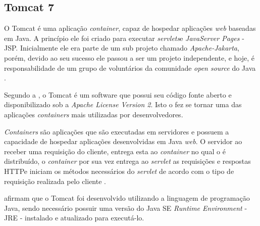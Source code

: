 \subsection{Tomcat 7}

\par O Tomcat é uma aplicação \textit{container}, capaz de hospedar aplicações \textit{web} baseadas em Java. A princípio ele foi criado para executar \textit{servlets}\footnotemark[14] e \textit{JavaServer Pages} - JSP\footnotemark[15]. Inicialmente ele era parte de um sub projeto chamado \textit{Apache-Jakarta}, porém, devido ao seu sucesso ele passou a ser um projeto independente, e hoje, é responsabilidade de um grupo de voluntários da comunidade \textit{open source} do Java \cite{vukotic_goodwill_apache_tomcat_7}.



\par Segundo a , o Tomcat é um software que possui seu código fonte aberto e disponibilizado sob a \textit{Apache License Version 2}. Isto o fez se tornar uma das aplicações \textit{containers} mais utilizadas por desenvolvedores.

\par \textit{Containers} são aplicações que são executadas em servidores e possuem a capacidade de hospedar aplicações desenvolvidas em Java \textit{web}. O servidor ao receber uma requisição do cliente, entrega esta ao \textit{container} no qual o \textit{} é distribuído, o \textit{container} por sua vez entrega ao \textit{servlet} as requisições e respostas HTTP\footnotemark[16] e iniciam os métodos necessários do \textit{servlet} de acordo com o tipo de requisição realizada pelo cliente \cite{basham_sierra_bates_use_cabeca_servlets_jsp}.


\par {} afirmam que o Tomcat foi desenvolvido utilizando a linguagem de programação Java, sendo necessário possuir uma versão do Java SE \textit{Runtime Environment} - JRE - instalado e atualizado para executá-lo.

